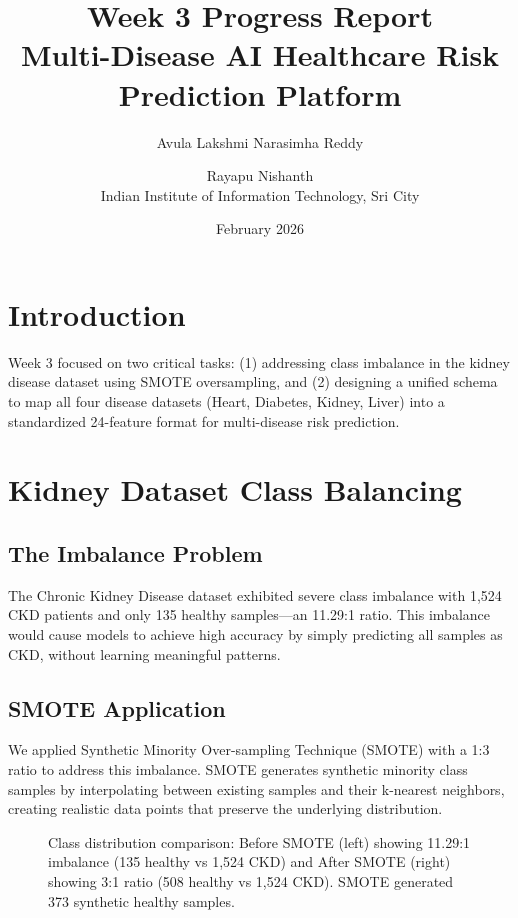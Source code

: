 \documentclass[11pt,a4paper]{article}
\title{
    \textbf{Week 3 Progress Report}\\[0.3cm]
    \large Multi-Disease AI Healthcare Risk Prediction Platform
}
\author{
    Avula Lakshmi Narasimha Reddy \and Rayapu Nishanth\\[0.2cm]
    Indian Institute of Information Technology, Sri City
}
\date{February 2026}
\begin{document}
\maketitle

\section{Introduction}

Week 3 focused on two critical tasks: (1) addressing class imbalance in the kidney disease dataset using SMOTE oversampling, and (2) designing a unified schema to map all four disease datasets (Heart, Diabetes, Kidney, Liver) into a standardized 24-feature format for multi-disease risk prediction.

\section{Kidney Dataset Class Balancing}

\subsection{The Imbalance Problem}

The Chronic Kidney Disease dataset exhibited severe class imbalance with 1,524 CKD patients and only 135 healthy samples—an 11.29:1 ratio. This imbalance would cause models to achieve high accuracy by simply predicting all samples as CKD, without learning meaningful patterns.

\subsection{SMOTE Application}

We applied Synthetic Minority Over-sampling Technique (SMOTE) with a 1:3 ratio to address this imbalance. SMOTE generates synthetic minority class samples by interpolating between existing samples and their k-nearest neighbors, creating realistic data points that preserve the underlying distribution.

\begin{figure}[H]
\centering
\caption{Class distribution comparison: Before SMOTE (left) showing 11.29:1 imbalance (135 healthy vs 1,524 CKD) and After SMOTE (right) showing 3:1 ratio (508 healthy vs 1,524 CKD). SMOTE generated 373 synthetic healthy samples.}
\end{figure}
\end{document}
